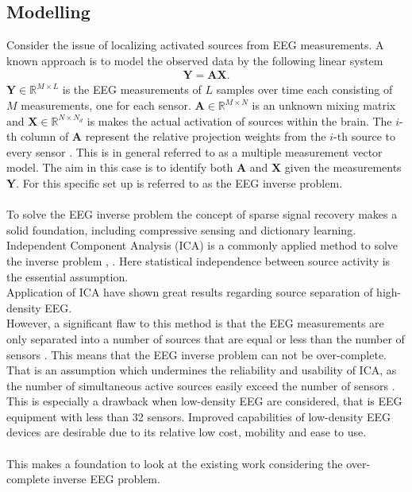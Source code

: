 \subsection{Modelling}
Consider the issue of localizing activated sources from EEG measurements. A known approach is to model the observed data by the following linear system 
\begin{align*}
\mathbf{Y} = \mathbf{AX}.
\end{align*}
$\mathbf{Y} \in \mathbb{R}^{M \times L}$ is the EEG measurements of $L$ samples over time each consisting of $M$ measurements, one for each sensor. $\mathbf{A} \in \mathbb{R}^{M \times N}$ is an unknown mixing matrix and $\mathbf{X} \in \mathbb{R}^{N \times N_d}$ is makes the actual activation of sources within the brain. 
The $i$-th column of $\mathbf{A}$ represent the relative projection weights from the $i$-th source to every sensor \cite{phd2015}. 
This is in general referred to as a multiple measurement vector model. 
The aim in this case is to identify both $\mathbf{A}$ and $\mathbf{X}$ given the measurements $\mathbf{Y}$. 
For this specific set up is referred to as the EEG inverse problem.  
\\ \\
To solve the EEG inverse problem the concept of sparse signal recovery makes a solid foundation, including compressive sensing and dictionary learning. 
Independent Component Analysis (ICA) is a commonly applied method to solve the inverse problem \cite{Scott1996}, \cite{Scott1997}. Here statistical independence between source activity is the essential assumption. 
\\
Application of ICA have shown great results regarding source separation of high-density EEG. 
\\
However, a significant flaw to this method is that the EEG measurements are only separated into a number of sources that are equal or less than the number of sensors \cite{Balkan2015}.
This means that the EEG inverse problem can not be over-complete. 
That is an assumption which undermines the reliability and usability of ICA, as the number of simultaneous active sources easily exceed the number of sensors \cite{phd2015}. 
This is especially a drawback when low-density EEG are considered, that is EEG equipment with less than 32 sensors. 
Improved capabilities of low-density EEG devices are desirable due to its relative low cost, mobility and ease to use. 
\\ \\
This makes a foundation to look at the existing work considering the over-complete inverse EEG problem. 

